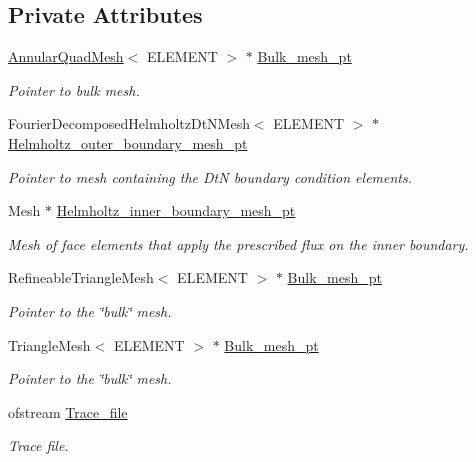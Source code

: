 \subsection*{Private Attributes}
\begin{DoxyCompactItemize}
\item 
\hyperlink{classAnnularQuadMesh}{Annular\+Quad\+Mesh}$<$ E\+L\+E\+M\+E\+NT $>$ $\ast$ \hyperlink{classFourierDecomposedHelmholtzProblem_ad5927e4a2156e96c55ebce044c6f9653}{Bulk\+\_\+mesh\+\_\+pt}
\begin{DoxyCompactList}\small\item\em Pointer to bulk mesh. \end{DoxyCompactList}\item 
Fourier\+Decomposed\+Helmholtz\+Dt\+N\+Mesh$<$ E\+L\+E\+M\+E\+NT $>$ $\ast$ \hyperlink{classFourierDecomposedHelmholtzProblem_ab7aafa9c0ab982d9e1fdc31d802d309b}{Helmholtz\+\_\+outer\+\_\+boundary\+\_\+mesh\+\_\+pt}
\begin{DoxyCompactList}\small\item\em Pointer to mesh containing the DtN boundary condition elements. \end{DoxyCompactList}\item 
Mesh $\ast$ \hyperlink{classFourierDecomposedHelmholtzProblem_a3ecc5a3fc3407de8985ed9a61402f2f0}{Helmholtz\+\_\+inner\+\_\+boundary\+\_\+mesh\+\_\+pt}
\begin{DoxyCompactList}\small\item\em Mesh of face elements that apply the prescribed flux on the inner boundary. \end{DoxyCompactList}\item 
Refineable\+Triangle\+Mesh$<$ E\+L\+E\+M\+E\+NT $>$ $\ast$ \hyperlink{classFourierDecomposedHelmholtzProblem_a48a453a291906bbc152c21e2151bcb0c}{Bulk\+\_\+mesh\+\_\+pt}
\begin{DoxyCompactList}\small\item\em Pointer to the \char`\"{}bulk\char`\"{} mesh. \end{DoxyCompactList}\item 
Triangle\+Mesh$<$ E\+L\+E\+M\+E\+NT $>$ $\ast$ \hyperlink{classFourierDecomposedHelmholtzProblem_aa7ce7dc89eae3e8a753d3b8f0d71dbc4}{Bulk\+\_\+mesh\+\_\+pt}
\begin{DoxyCompactList}\small\item\em Pointer to the \char`\"{}bulk\char`\"{} mesh. \end{DoxyCompactList}\item 
ofstream \hyperlink{classFourierDecomposedHelmholtzProblem_ab9786130005c43637f8b305c2becc555}{Trace\+\_\+file}
\begin{DoxyCompactList}\small\item\em Trace file. \end{DoxyCompactList}\end{DoxyCompactItemize}


